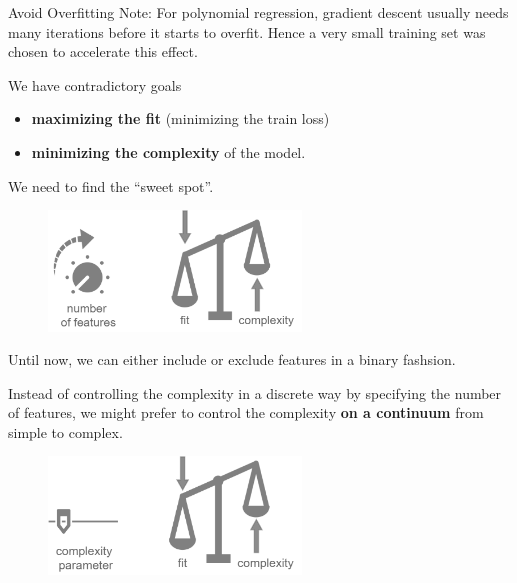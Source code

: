 \documentclass[11pt,compress,t,notes=noshow, xcolor=table]{beamer}
\begin{document}
\begin{vbframe}{Avoid Overfitting}
\footnotesize{Note: For polynomial regression, gradient descent usually needs many iterations before it starts to overfit. Hence a very small training set was chosen to accelerate this effect.}

\framebreak 

We have contradictory goals

\begin{itemize}
\item \textbf{maximizing the fit} (minimizing the train loss)
\item \textbf{minimizing the complexity} of the model.
\end{itemize}

We need to find the \enquote{sweet spot}.

\begin{center}
\begin{figure}
\includegraphics[width=0.6\textwidth]{figure_man/complexity-vs-fit.png}
\end{figure}
\end{center}

\framebreak 

Until now, we can either include or exclude features in a binary fashsion.

\lz 

Instead of controlling the complexity in a discrete way by specifying the number of features,
we might prefer to control the complexity  \textbf{on a continuum} from simple to complex.

\begin{center}
\begin{figure}
\includegraphics[width=0.6\textwidth]{figure_man/complexity-vs-fit-continuous.png}
\end{figure}
\end{center}

\end{vbframe}
\end{document}

